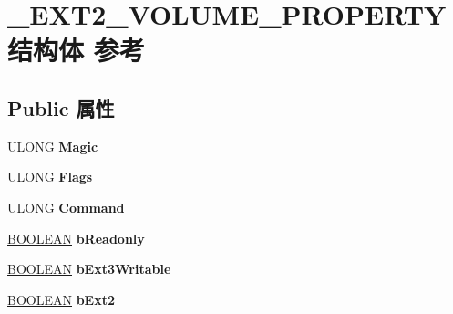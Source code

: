 \hypertarget{struct___e_x_t2___v_o_l_u_m_e___p_r_o_p_e_r_t_y}{}\section{\+\_\+\+E\+X\+T2\+\_\+\+V\+O\+L\+U\+M\+E\+\_\+\+P\+R\+O\+P\+E\+R\+T\+Y结构体 参考}
\label{struct___e_x_t2___v_o_l_u_m_e___p_r_o_p_e_r_t_y}
\subsection*{Public 属性}
\begin{DoxyCompactItemize}
\item 
\mbox{\label{struct___e_x_t2___v_o_l_u_m_e___p_r_o_p_e_r_t_y_a5d3c7aafa14fbf5c67c69341c9581908}} 
U\+L\+O\+NG {\bfseries Magic}
\item 
\mbox{\label{struct___e_x_t2___v_o_l_u_m_e___p_r_o_p_e_r_t_y_ab2c143916eb357b59f5a9c3e204ebe48}} 
U\+L\+O\+NG {\bfseries Flags}
\item 
\mbox{\label{struct___e_x_t2___v_o_l_u_m_e___p_r_o_p_e_r_t_y_a5b4adbb24730bf2c25fb2e0024351bfb}} 
U\+L\+O\+NG {\bfseries Command}
\item 
\mbox{\label{struct___e_x_t2___v_o_l_u_m_e___p_r_o_p_e_r_t_y_a1c615ffa01c5e188c5ddbc5ed0922943}} 
\hyperlink{_processor_bind_8h_a112e3146cb38b6ee95e64d85842e380a}{B\+O\+O\+L\+E\+AN} {\bfseries b\+Readonly}
\item 
\mbox{\label{struct___e_x_t2___v_o_l_u_m_e___p_r_o_p_e_r_t_y_a8449ec50b6dba5dee94d1c41bb0b7026}} 
\hyperlink{_processor_bind_8h_a112e3146cb38b6ee95e64d85842e380a}{B\+O\+O\+L\+E\+AN} {\bfseries b\+Ext3\+Writable}
\item 
\mbox{\label{struct___e_x_t2___v_o_l_u_m_e___p_r_o_p_e_r_t_y_ad76fa30ac4b345732e624d02dc0df4aa}} 
\hyperlink{_processor_bind_8h_a112e3146cb38b6ee95e64d85842e380a}{B\+O\+O\+L\+E\+AN} {\bfseries b\+Ext2}

\end{DoxyCompactItemize}
